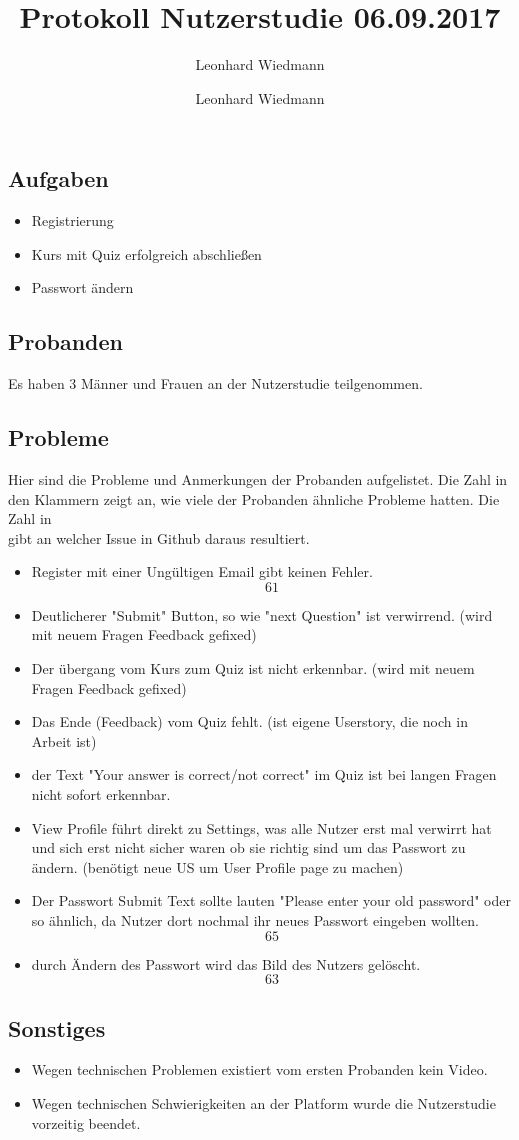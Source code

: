 \documentclass[colorback, accentcolor=tud1c, paper=a4]{tudexercise}
\title{Protokoll Nutzerstudie 06.09.2017}
\subtitle{Leonhard Wiedmann}
\author{Leonhard Wiedmann}
\begin{document}
\maketitle
\subsection*{Aufgaben}
\begin{itemize}
  \item Registrierung
  \item Kurs mit Quiz erfolgreich abschließen
  \item Passwort ändern
\end{itemize}

\subsection*{Probanden}
Es haben 3 Männer und Frauen an der Nutzerstudie teilgenommen.

\subsection*{Probleme}
Hier sind die Probleme und Anmerkungen der Probanden aufgelistet. Die Zahl in den Klammern zeigt an, wie viele der Probanden ähnliche Probleme hatten. Die Zahl in \[\] gibt an welcher Issue in Github daraus resultiert.
\begin{itemize}
	\item Register mit einer Ungültigen Email gibt keinen Fehler. \[61\]
	\item Deutlicherer "Submit" Button, so wie "next Question" ist verwirrend. (wird mit neuem Fragen Feedback gefixed)
	\item Der übergang vom Kurs zum Quiz ist nicht erkennbar. (wird mit neuem Fragen Feedback gefixed)
	\item Das Ende (Feedback) vom Quiz fehlt. (ist eigene Userstory, die noch in Arbeit ist)
	\item der Text "Your answer is correct/not correct" im Quiz ist bei langen Fragen nicht sofort erkennbar.
	\item View Profile führt direkt zu Settings, was alle Nutzer erst mal verwirrt hat und sich erst nicht sicher waren ob sie richtig sind um das Passwort zu ändern. (benötigt neue US um User Profile page zu machen)
	\item Der Passwort Submit Text sollte lauten "Please enter your old password" oder so ähnlich, da Nutzer dort nochmal ihr neues Passwort eingeben wollten. \[65\]
	\item durch Ändern des Passwort wird das Bild des Nutzers gelöscht. \[63\]
   \end{itemize}

\subsection*{Sonstiges}
\begin{itemize}
	\item Wegen technischen Problemen existiert vom ersten Probanden kein Video.
	\item Wegen technischen Schwierigkeiten an der Platform wurde die Nutzerstudie vorzeitig beendet.
\end{itemize}
\end{document}

